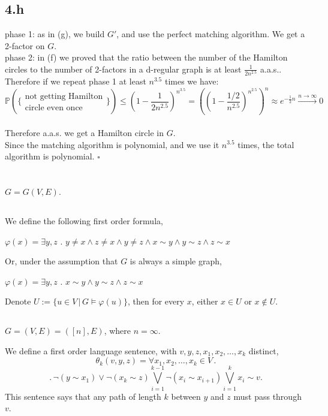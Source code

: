 \documentclass{article}
\begin{document}
\subsection*{4.h}
phase 1: as in (g), we build $G'$, and use the perfect matching algorithm. We get a 2-factor on $G$.\\
phase 2: in (f) we proved that the ratio between the number of the Hamilton circles to the number of 2-factors in a d-regular graph is at least $\frac{1}{2n^{2.5}}$ a.a.s.. Therefore if we repeat phase 1 at least $n^{3.5}$ times we have:
\[
\mathbb{P}(\{\substack{\text{not getting Hamilton} \\ \text{circle even once}}\})\leq(1-\frac{1}{2n^{2.5}})^{n^{3.5}}=((1-\frac{1/2}{n^{2.5}})^{n^{2.5}})^n\approx e^{-\frac{1}{2}n}\xrightarrow{n \to \infty}0
\]\\
Therefore a.a.s. we get a Hamilton circle in $G$.\\
Since the matching algorithm is polynomial, and we use it $n^{3.5}$ times, the total algorithm is polynomial.
\hfill $\square$
\section{}
$G=G(V,E)$.
\subsection{}
We define the following first order formula,

$\varphi(x)=\exists{y,z}$ . $y\neq{x}\land{z\neq{x}}\land{y\neq{z}}\land{x\sim{y}}\land{y\sim{z}}\land{z\sim{x}}$

Or, under the assumption that $G$ is always a simple graph,

$\varphi(x)=\exists{y,z}$ . $x\sim{y}\land{y\sim{z}}\land{z\sim{x}}$

Denote $U:=\{u\in{V}\,|\,{G\vDash\varphi(u)}\}$, then for every $x$, either $x\in{U}$ or $x\notin{U}$.
\subsection{}
$G=(V,E)=([n],E)$, where $n=\infty$.

We define a first order language sentence, with $v,y,z,x_1,x_2,\dots,x_k$ distinct,
\[\theta_k(v,y,z)=\forall{x_1,x_2,\dots,x_k}\in{V}\,.\]\[.\,\neg(y\sim{x_1})\lor\neg(x_k\sim{z})\bigvee_{i=1}^{k-1}\neg(x_i\sim{x_{i+1}})\bigvee_{i=1}^{k}x_i\sim{v}.\]
This sentence says that any path of length $k$ between $y$ and $z$ must pass through $v$.
\end{document}

